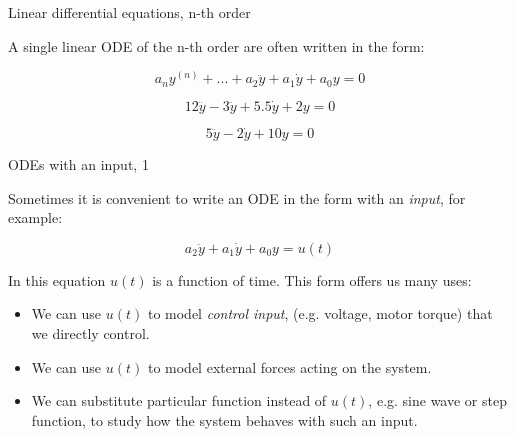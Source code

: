 \documentclass{beamer}
\begin{document}
\begin{frame}{Linear differential equations, n-th order}
\begin{flushleft}

A single linear ODE of the n-th order are often written in the form:

\begin{equation}
    a_n y^{(n)} + 
    ... +
    a_2 \ddot{y} + a_1 \dot{y} + 
    a_0 y = 0
\end{equation}

\begin{example}
\begin{equation}
12 \dddot{y} -
    3 \ddot{y} + 5.5 \dot{y} + 
    2 y = 0
\end{equation}
\end{example}

\begin{example}
\begin{equation}
    5 \ddot{y} - 2 \dot{y} + 
    10 y = 0
\end{equation}
\end{example}

\end{flushleft}
\end{frame}




\begin{frame}{ODEs with an input, 1}
	\begin{flushleft}
		
		Sometimes it is convenient to write an ODE in the form with an \emph{input}, for example:
		
		\begin{equation}
			a_2 \ddot{y} + a_1 \dot{y} + 
			a_0 y = u(t)
		\end{equation}
		
		In this equation $u(t)$ is a function of time. This form offers us many uses:
		
		\begin{itemize}
			\item We can use $u(t)$ to model \emph{control input}, (e.g. voltage, motor torque) that we directly control.
			
			\item We can use $u(t)$ to model external forces acting on the system.
			
			\item We can substitute particular function instead of $u(t)$, e.g. sine wave or step function, to study how the system behaves with such an input.
		\end{itemize}
		
	\end{flushleft}
\end{frame}
\end{document}
